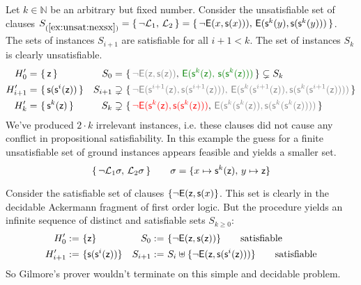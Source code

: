 %

\begin{example}\label{ex:unsat:nexsx}
	Let $k\in\mathbb{N}$ be an arbitrary but fixed number.
	Consider the unsatisfiable set of clauses
	$S_{(\ref{ex:unsat:nexsx})} = \{\, \lnot{\mathcal L}_1,\,{\mathcal L}_2\, \} =
	\{\,
	{ \lnot{\mathsf{E}}(x, {\mathsf s}(x)))},\, 
	{ {\mathsf{E}}({\mathsf s}^{k}(y), {\mathsf s}({\mathsf s}^{k}(y)))}
	\,\}$.
	The sets of instances $S_{i+1}$ are satisfiable for all $i+1<k$.
	The set of instances $S_{k}$ is clearly unsatisfiable.
	\begin{align*}
	H'_{0} =&\ \{\,\mzero\,\} 
	&
	S_{0} =&\ \{\, 
	{\colG \lnot\mE(\mzero,\msucc(\mzero))},\,
	{\colHi \mE(\msucc^k(\mzero),\,\msucc(\msucc^k(\mzero)))}
	\,\}
	\subsetneq S_k
	\\
	H'_{i+1} =&\ \{\,\msucc(\msucc^{i}(\mzero))\,\}
	&
	S_{i+1} \supsetneq&\
	\{\,
	{\colG \lnot\mE(\msucc^{i+1}(\mzero),\msucc(\msucc^{i+1}(\mzero))),\,
		\mE(\msucc^k(\msucc^{i+1}(\mzero)), \msucc(\msucc^k(\msucc^{i+1}(\mzero))))}
	\,\}
	\\
	H'_{k} =&\ \{\,\msucc^{k}(\mzero)\,\} 
	&
	S_{k} \supsetneq&\
	\{\,
	{\colLo \lnot\mE(\msucc^{k}(\mzero),\msucc(\msucc^{k}(\mzero)))},\,
	{\colG\mE(\msucc^k(\msucc^{k}(\mzero)), \msucc(\msucc^k(\msucc^{k}(\mzero))))}
	\,\}
	\end{align*}
	We've produced $2\cdot k$ {\myem irrelevant} instances, i.e. these clauses did not cause any conflict in 
	propositional satisfiability. 
	In this example the guess for a finite unsatisfiable set of ground instances appears feasible and yields a smaller set.
	\[
	\{\, 
	\lnot{\mathcal L}_1\sigma,\,{\mathcal L}_2\sigma
	\,\} \qquad \sigma=\{x\mapsto {\mathsf s}^k({\mathsf z}),\,y\mapsto {\mathsf z}\}
	\]
\end{example}

\begin{example}\label{ex:sat:exy}
	Consider the satisfiable set of clauses $\{\lnot{\mathsf{E}}({\mathsf z},{\mathsf s}(x)\}$.
	This set is clearly in the decidable Ackermann fragment of first order logic.
	But the procedure yields an infinite sequence of distinct and satisfiable sets $S_{k\geq0}$:
	\begin{align*}
	H'_{0} :=&\  \{ {\mathsf z} \} 
	&
	S_{0} :=&\ \{ \lnot{\mathsf{E}}({\mathsf z},{\mathsf s}({\mathsf z}))
	\}
	\tag*{satisfiable}
	\\
	H'_{i+1} :=&\ \{ {\mathsf s}({\mathsf s}^{i}({\mathsf z})) \} 
	&
	S_{i+1} :=&\ S_i \uplus 
	\{
	\lnot{\mathsf{E}}({\mathsf z},{\mathsf s}({\mathsf s}^i({\mathsf z})))
	\}
	\tag*{satisfiable}
	\end{align*}
	So Gilmore's prover wouldn't terminate on this simple and decidable problem.
\end{example}



